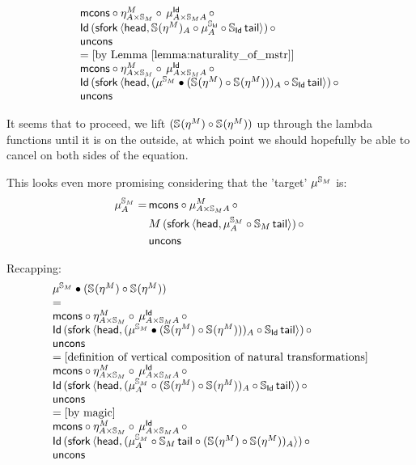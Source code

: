 \documentclass{article}
\begin{document}
$$\begin{array}{ll}
	 \mathsf{mcons} \circ \eta^M_{A \times \mathbb{S}_{M}} \circ\, \mu^{\mathsf{Id}}_{A \times \mathbb{S}_{M}A}\, \circ\, \\ 
	 \mathsf{Id}\,(\mathsf{sfork}\,\langle \mathsf{head}, \mathbb{S}_{}(\eta^M)_A \circ \mu^{\mathbb{S}_{\mathsf{Id}}}_A \circ \mathbb{S}_{\mathsf{Id}}\,\mathsf{tail} \rangle)\, \circ\, \\
	 \mathsf{uncons} \\
	 = \text{[by Lemma \ref{lemma:naturality_of_mstr}]}\\
	 \mathsf{mcons} \circ \eta^M_{A \times \mathbb{S}_{M}} \circ\, \mu^{\mathsf{Id}}_{A \times \mathbb{S}_{M}A}\, \circ\, \\ 
	 \mathsf{Id}\,(\mathsf{sfork}\,\langle \mathsf{head}, (\mu^{\mathbb{S}_{M}} \bullet (\mathbb{S}_{}(\eta^M) \circ \mathbb{S}_{}(\eta^M)))_A \circ \mathbb{S}_{\mathsf{Id}}\,\mathsf{tail} \rangle)\, \circ\, \\
	 \mathsf{uncons} \\
\end{array}
$$

It seems that to proceed, we lift $(\mathbb{S}_{}(\eta^M) \circ \mathbb{S}_{}(\eta^M))$ up through the lambda functions until it is on the outside, at which point we should hopefully be able to cancel on both sides of the equation. 

This looks even more promising considering that the 'target' $\mu^{\mathbb{S}_{M}}$ is:
\begin{align*}
	\mu^{\mathbb{S}_{M}}_A =\, &\mathsf{mcons} \circ \mu^M_{A \times \mathbb{S}_{M}A}\, \circ\, \\
	&M\,(\mathsf{sfork}\,\langle \mathsf{head}, \mu^{\mathbb{S}_{M}}_A \circ \mathbb{S}_{M}\,\mathsf{tail} \rangle)\, \circ\, \\
	&\mathsf{uncons}
\end{align*}

Recapping:
$$
\begin{array}{ll}
	\mu^{\mathbb{S}_{M}} \bullet (\mathbb{S}_{}(\eta^M) \circ \mathbb{S}_{}(\eta^M)) \\
	= \\
	 \mathsf{mcons} \circ \eta^M_{A \times \mathbb{S}_{M}} \circ\, \mu^{\mathsf{Id}}_{A \times \mathbb{S}_{M}A}\, \circ\, \\ 
	 \mathsf{Id}\,(\mathsf{sfork}\,\langle \mathsf{head}, (\mu^{\mathbb{S}_{M}} \bullet (\mathbb{S}_{}(\eta^M) \circ \mathbb{S}_{}(\eta^M)))_A \circ \mathbb{S}_{\mathsf{Id}}\,\mathsf{tail} \rangle)\, \circ\, \\
	 \mathsf{uncons} \\
	 = \text{[definition of vertical composition of natural transformations]}\\
	 \mathsf{mcons} \circ \eta^M_{A \times \mathbb{S}_{M}} \circ\, \mu^{\mathsf{Id}}_{A \times \mathbb{S}_{M}A}\, \circ\, \\ 
	 \mathsf{Id}\,(\mathsf{sfork}\,\langle \mathsf{head}, (\mu^{\mathbb{S}_{M}}_A \circ (\mathbb{S}_{}(\eta^M) \circ \mathbb{S}_{}(\eta^M))_A \circ \mathbb{S}_{\mathsf{Id}}\,\mathsf{tail} \rangle)\, \circ\, \\
	 \mathsf{uncons} \\
	 = \text{[by magic]}\\
	 \mathsf{mcons} \circ \eta^M_{A \times \mathbb{S}_{M}} \circ\, \mu^{\mathsf{Id}}_{A \times \mathbb{S}_{M}A}\, \circ\, \\ 
	 \mathsf{Id}\,(\mathsf{sfork}\,\langle \mathsf{head}, (\mu^{\mathbb{S}_{M}}_A \circ \mathbb{S}_{M}\,\mathsf{tail} \circ (\mathbb{S}_{}(\eta^M) \circ \mathbb{S}_{}(\eta^M))_A \rangle)\, \circ\, \\
	 \mathsf{uncons} \\
\end{array}
$$
\end{document}
